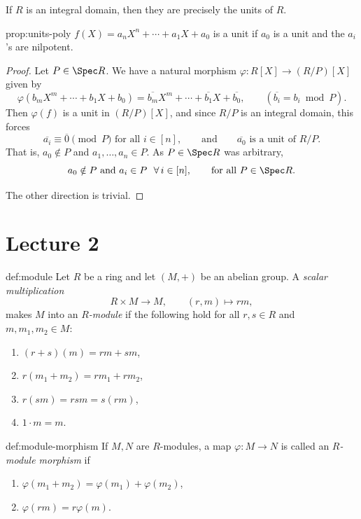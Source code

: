 If $R$ is an integral domain, then they are precisely the units of $R$.

\begin{proposition}{}{prop:units-poly}
$f(X) = a_n X^n + \cdots + a_1 X + a_0$ is a unit if $a_0$ is a unit and the $a_i$'s are nilpotent.
\end{proposition}

\begin{proof}
Let $P \in \Spec R$. We have a natural morphism $\varphi: R[X] \to (R/P)[X]$ given by
\[
\varphi(b_m X^m + \cdots + b_1 X + b_0) = \overline{b_m} X^m + \cdots + \overline{b_1} X + \overline{b_0}, \qquad (\overline{b_i} = b_i \bmod P).
\]
Then $\varphi(f)$ is a unit in $(R/P)[X]$, and since $R/P$ is an integral domain, this forces
\[
\overline{a_i} \equiv \overline{0} \pmod{P} \text{ for all } i \in [n], \qquad \text{and} \qquad \overline{a_0} \text{ is a unit of } R/P.
\]
That is, $a_0 \notin P$ and $a_1, \ldots, a_n \in P$. As $P \in \Spec R$ was arbitrary,
\[
a_0 \notin P \text{ and } a_i \in P \ \ \forall\, i \in [n], \qquad \text{for all } P \in \Spec R.
\]

The other direction is trivial.
\end{proof}

\section{Lecture 2}

\begin{definition}{}{def:module}
Let $R$ be a ring and let $(M, +)$ be an abelian group. A \emph{scalar multiplication}
\[
R \times M \longrightarrow M, \qquad (r, m) \longmapsto rm,
\]
makes $M$ into an \emph{$R$-module} if the following hold for all $r, s \in R$ and $m, m_1, m_2 \in M$:
\begin{enumerate}[label=(\roman*)]
    \item $(r + s)(m) = rm + sm$,
    \item $r(m_1 + m_2) = rm_1 + rm_2$,
    \item $r(sm) = rsm = s(rm)$,
    \item $1 \cdot m = m$.
\end{enumerate}
\end{definition}

\begin{definition}{}{def:module-morphism}
If $M, N$ are $R$-modules, a map $\varphi: M \to N$ is called an \emph{$R$-module morphism} if
\begin{enumerate}[label=(\roman*)]
    \item $\varphi(m_1 + m_2) = \varphi(m_1) + \varphi(m_2)$,
    \item $\varphi(rm) = r\varphi(m)$.
\end{enumerate}
\end{definition}

